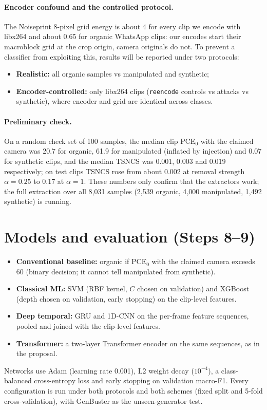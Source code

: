 \documentclass[11pt,a4paper]{article}
\begin{document}
\paragraph{Encoder confound and the controlled protocol.} The Noiseprint 8-pixel grid energy is about
4 for every clip we encode with libx264 and about 0.65 for organic WhatsApp clips: our encodes start
their macroblock grid at the crop origin, camera originals do not. To prevent a classifier from
exploiting this, results will be reported under two protocols:
\begin{itemize}
  \item \textbf{Realistic:} all organic samples vs manipulated and synthetic;
  \item \textbf{Encoder-controlled:} only libx264 clips (\texttt{reencode} controls vs attacks vs
        synthetic), where encoder and grid are identical across classes.
\end{itemize}

\paragraph{Preliminary check.} On a random check set of 100 samples, the median clip PCE$_0$ with the
claimed camera was 20.7 for organic, 61.9 for manipulated (inflated by injection) and 0.07 for
synthetic clips, and the median TSNCS was 0.001, 0.003 and 0.019 respectively; on test clips TSNCS
rose from about 0.002 at removal strength $\alpha=0.25$ to 0.17 at $\alpha=1$. These numbers only confirm that the extractors work; the full
extraction over all 8{,}031 samples (2{,}539 organic, 4{,}000 manipulated, 1{,}492 synthetic) is running.

\section{Models and evaluation (Steps 8--9)}

\begin{itemize}
  \item \textbf{Conventional baseline:} organic if PCE$_0$ with the claimed camera exceeds 60 (binary
        decision; it cannot tell manipulated from synthetic).
  \item \textbf{Classical ML:} SVM (RBF kernel, $C$ chosen on validation) and XGBoost (depth chosen on
        validation, early stopping) on the clip-level features.
  \item \textbf{Deep temporal:} GRU and 1D-CNN on the per-frame feature sequences, pooled and joined
        with the clip-level features.
  \item \textbf{Transformer:} a two-layer Transformer encoder on the same sequences, as in the proposal.
\end{itemize}
Networks use Adam (learning rate 0.001), L2 weight decay ($10^{-4}$), a class-balanced cross-entropy
loss and early stopping on validation macro-F1. Every configuration is run under both protocols and
both schemes (fixed split and 5-fold cross-validation), with GenBuster as the unseen-generator test.
\end{document}
